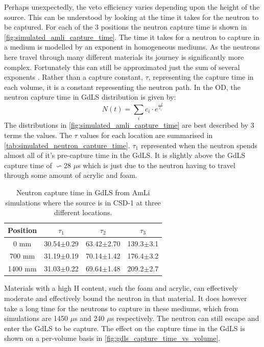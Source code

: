 \par
Perhaps unexpectedly, the veto efficiency varies depending upon the height of the source.
This can be understood by looking at the time it takes for the neutron to be captured.
For each of the 3 positions the neutron capture time is shown in \autoref{fig:simulated_amli_capture_time}.
The time it takes for a neutron to capture in a medium is modelled by an exponent in homogeneous mediums.
As the neutrons here travel through many different materials its journey is significantly more complex.
Fortunately this can still be approximated just the sum of several exponents \cite{Dayabay_neutron_capture_fit_ref}.
Rather than a capture constant, $\tau$, representing the capture time in each volume, it is a constant representing the neutron path.
In the OD, the neutron capture time in GdLS distribution is given by:
\begin{equation}
    N(t) = \sum_{i} c_i \cdot e^{\frac{-t}{t_i}}
\label{eq:neutron_capture_time}
\end{equation}
The distributions in \autoref{fig:simulated_amli_capture_time} are best described by 3 terms the values.
The $\tau$ values for each location are summarised in \autoref{tab:simulated_neutron_capture_time}.
$\tau_1$ represented when the neutron spends almost all of it's pre-capture time in the GdLS.
It is slightly above the GdLS capture time of $\backsim$28 $\mu$s \cite{ucsb_gdls_dicebox_simulations_ref} which is just due to the neutron having to travel through some amount of acrylic and foam.
\begin{table}[]
    \centering
    \begin{tabular}{c|c|c|c}
        Position  &  $\tau_1$      & $\tau_2$       & $\tau_3$        \\ \hline
        0 mm      & 30.54$\pm$0.29 & 63.42$\pm$2.70 & 139.3$\pm$3.1   \\ 
        700 mm    & 31.19$\pm$0.19 & 70.14$\pm$1.42 & 176.4$\pm$3.2   \\
        1400 mm   & 31.03$\pm$0.22 & 69.64$\pm$1.48 & 209.2$\pm$2.7         
    \end{tabular}
    \caption{Neutron capture time in GdLS from AmLi simulations where the source is in CSD-1 at three different locations.}
    \label{tab:simulated_neutron_capture_time}
\end{table}
\par
Materials with a high H content, such the foam and acrylic, can effectively moderate and effectively bound the neutron in that material.
It does however take a long time for the neutrons to capture in these mediums, which from simulations are 1450 $\mu$s and 240 $\mu$s respectively.
The neutron can still escape and enter the GdLS to be capture.
The effect on the capture time in the GdLS is shown on a per-volume basis in \autoref{fig:gdls_capture_time_vs_volume}.

